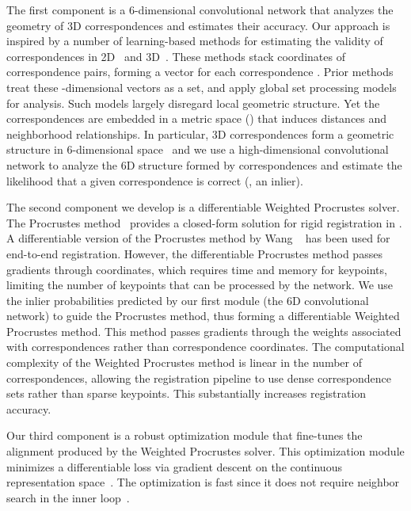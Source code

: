\documentclass[10pt,twocolumn,letterpaper]{article}
\begin{document}
The first component is a 6-dimensional convolutional network that analyzes the geometry of 3D correspondences and estimates their accuracy.
Our approach is inspired by a number of learning-based methods for estimating the validity of correspondences in 2D~\cite{Yi2018,Ranftl2018} and 3D~\cite{dias2019corr}. 
These methods stack coordinates of correspondence pairs, forming a vector  for each correspondence .
Prior methods treat these -dimensional vectors as a set, and apply global set processing models for analysis. Such models largely disregard local geometric structure. Yet the correspondences are embedded in a metric space () that induces distances and neighborhood relationships.
In particular, 3D correspondences form a geometric structure in 6-dimensional space~\cite{choy2020high} and we use a high-dimensional convolutional network to analyze the 6D structure formed by correspondences and estimate the likelihood that a given correspondence is correct (\ie, an inlier).



The second component we develop is a differentiable Weighted Procrustes solver. The Procrustes method~\cite{gower1975generalized} provides a closed-form solution for rigid registration in . A differentiable version of the Procrustes method by Wang \etal~\cite{wang2019deep} has been used for end-to-end registration.
However, the differentiable Procrustes method passes gradients through coordinates, which requires  time and memory for  keypoints, limiting the number of keypoints that can be processed by the network.
We use the inlier probabilities predicted by our first module (the 6D convolutional network) to guide the Procrustes method, thus forming a differentiable Weighted Procrustes method. This method passes gradients through the weights associated with correspondences rather than correspondence coordinates.
The computational complexity of the Weighted Procrustes method is linear in the number of correspondences, allowing the registration pipeline to use dense correspondence sets rather than sparse keypoints. This substantially increases registration accuracy.



Our third component is a robust optimization module that fine-tunes the alignment produced by the Weighted Procrustes solver.
This optimization module minimizes a differentiable loss via gradient descent on the continuous  representation space~\cite{zhou2019continuity}.
The optimization is fast since it does not require neighbor search in the inner loop~\cite{zhang1994iterative}.
\end{document}

